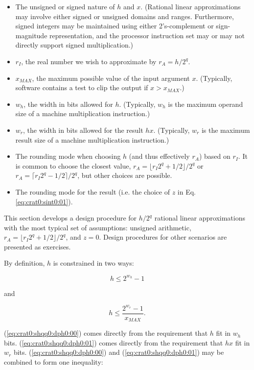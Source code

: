 \begin{itemize}
\item The unsigned or signed nature of $h$ and $x$. (Rational linear approximations
      may involve either signed or unsigned domains and ranges.  Furthermore,
	  signed integers may be maintained using either 2's-complement
	  or sign-magnitude representation, and the processor instruction set
	  may or may not directly support signed multiplication.)
\item $r_I$, the real number we wish to approximate by $r_A = h/2^q$.
\item $x_{MAX}$, the maximum possible value of the input argument $x$.  (Typically,
      software contains a test to clip the output if $x > x_{MAX}$.)
\item $w_h$, the width in bits allowed for $h$.  (Typically, $w_h$ is 
      the maximum operand size of a machine multiplication instruction.)
\item $w_r$, the width in bits allowed for the result $hx$.  (Typically,
      $w_r$ is the maximum result size of a machine multiplication instruction.)
\item The rounding mode when choosing $h$ (and thus effectively $r_A$) 
      based on $r_I$.  It is common to choose the
      closest value, 
	  $r_A=\lfloor r_I 2^q + 1/2 \rfloor/2^q$
	  or
	  $r_A=\lceil r_I 2^q - 1/2 \rceil/2^q$,
	  but other choices are possible.
\item The rounding mode for the result (i.e. the choice of $z$ in
      Eq. \ref{eq:crat0:sint0:01}).
\end{itemize}

This section develops a design procedure for $h/2^q$ rational linear
approximations with the most typical set of assumptions:  unsigned arithmetic,
$r_A=\lfloor r_I 2^q + 1/2 \rfloor/2^q$,
and $z=0$.  Design procedures for other scenarios are presented as exercises.

By definition, $h$ is constrained in two ways:

\begin{equation}
\label{eq:crat0:shqq0:dph0:00}
h \leq 2^{w_h} - 1
\end{equation}

\noindent{}and

\begin{equation}
\label{eq:crat0:shqq0:dph0:01}
h \leq \frac{2^{w_r} - 1}{x_{MAX}} .
\end{equation}

\noindent{}(\ref{eq:crat0:shqq0:dph0:00}) comes directly from the
requirement that $h$ fit in $w_h$ bits.
(\ref{eq:crat0:shqq0:dph0:01}) comes directly from the requirement
that $hx$ fit in $w_r$ bits.
(\ref{eq:crat0:shqq0:dph0:00}) and (\ref{eq:crat0:shqq0:dph0:01})
may be combined to form one inequality:


